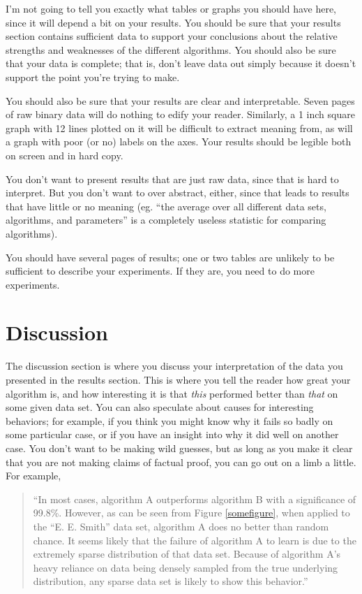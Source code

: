 \documentclass[12pt, letterpaper]{article}
\begin{document}
I'm not going to tell you exactly what tables or graphs you should have here,
since it will depend a bit on your results.  You should be sure that your
results section contains sufficient data to support your conclusions about the
relative strengths and weaknesses of the different algorithms.  You should also
be sure that your data is complete; that is, don't leave data out simply because
it doesn't support the point you're trying to make.

You should also be sure that your results are clear and interpretable.  Seven
pages of raw binary data will do nothing to edify your reader.  Similarly, a
1 inch square graph with 12 lines plotted on it will be difficult to extract
meaning from, as will a graph with poor (or no) labels on the axes.  Your
results should be legible both on screen and in hard copy.

You don't want to present results that are just raw data, since that is hard to
interpret.  But you don't want to over abstract, either, since that leads to
results that have little or no meaning (eg. ``the average over all different
data sets, algorithms, and parameters'' is a completely useless statistic for
comparing algorithms).

You should have several pages of results; one or two tables are unlikely to be
sufficient to describe your experiments.  If they are, you need to do more
experiments.

\section{Discussion}
The discussion section is where you discuss your interpretation of the data you
presented in the results section.  This is where you tell the reader how great
your algorithm is, and how interesting it is that \emph{this} performed better
than \emph{that} on some given data set.  You can also speculate about causes
for interesting behaviors; for example, if you think you might know why it fails
so badly on some particular case, or if you have an insight into why it did well
on another case.  You don't want to be making wild guesses, but as long as you
make it clear that you are not making claims of factual proof, you can go out on
a limb a little.  For example,

\begin{quote}
``In most cases, algorithm A outperforms algorithm B with a significance of
99.8\%.  However, as can be seen from Figure \ref{somefigure}, when applied to
the ``E. E. Smith'' data set, algorithm A does no better than random chance.  It
seems likely that the failure of algorithm A to learn is due to the extremely
sparse distribution of that data set.  Because of algorithm A's heavy reliance
on data being densely sampled from the true underlying distribution, any sparse
data set is likely to show this behavior.''
\end{quote}
\end{document}
